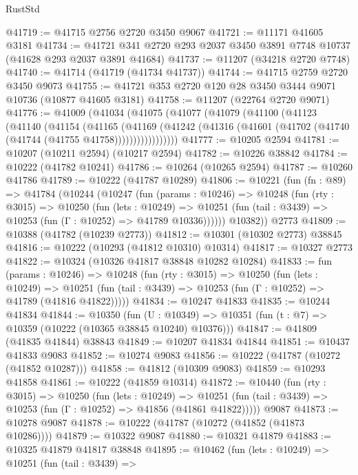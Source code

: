 \begin{lexlean}{RustStd}
\begin{coremodule}
@41719 := @41715 @2756 @2720 @3450 @9067
@41721 := @11171 @41605 @3181
@41734 := @41721 @341 @2720 @293 @2037 @3450 @3891 @7748 @10737 (@41628 @293 @2037 @3891 @41684)
@41737 := @11207 (@34218 @2720 @7748)
@41740 := @41714 (@41719 (@41734 @41737))
@41744 := @41715 @2759 @2720 @3450 @9073
@41755 := @41721 @353 @2720 @120 @28 @3450 @3444 @9071 @10736 (@10877 @41605 @3181)
@41758 := @11207 (@22764 @2720 @9071)
@41776 := @41009
    (@41034
      (@41075
        (@41077
          (@41079
            (@41100
              (@41123
                (@41140
                  (@41154
                    (@41165
                      (@41169
                        (@41242
                          (@41316 (@41601 (@41702 (@41740 (@41744 (@41755 @41758)))))))))))))))))
@41777 := @10205 @2594
@41781 := @10207 (@10211 @2594) (@10217 @2594)
@41782 := @10226 @38842
@41784 := @10222 (@41782 @10241)
@41786 := @10264 (@10265 @2594)
@41787 := @10260 @41786
@41789 := @10222 (@41787 @10289)
@41806 := @10221
    (fun (fn : @89) =>
    @41784
      (@10244
        (@10247
          (fun (params : @10246) =>
          @10248
            (fun (rty : @3015) =>
            @10250
              (fun (lets : @10249) =>
              @10251 (fun (tail : @3439) => @10253 (fun (Γ : @10252) => @41789 @10336))))))
        @10382))
    @2773
@41809 := @10388 (@41782 (@10239 @2773))
@41812 := @10301 (@10302 @2773) @38845
@41816 := @10222 (@10293 (@41812 @10310) @10314)
@41817 := @10327 @2773
@41822 := @10324 (@10326 @41817 @38848 @10282 @10284)
@41833 := fun (params : @10246) =>
  @10248
    (fun (rty : @3015) =>
    @10250
      (fun (lets : @10249) =>
      @10251 (fun (tail : @3439) => @10253 (fun (Γ : @10252) => @41789 (@41816 @41822)))))
@41834 := @10247 @41833
@41835 := @10244 @41834
@41844 := @10350
    (fun (U : @10349) => @10351 (fun (t : @7) => @10359 (@10222 (@10365 @38845 @10240) @10376)))
@41847 := @41809 (@41835 @41844) @38843
@41849 := @10207 @41834 @41844
@41851 := @10437 @41833 @9083
@41852 := @10274 @9083
@41856 := @10222 (@41787 (@10272 (@41852 @10287)))
@41858 := @41812 (@10309 @9083)
@41859 := @10293 @41858
@41861 := @10222 (@41859 @10314)
@41872 := @10440
    (fun (rty : @3015) =>
    @10250
      (fun (lets : @10249) =>
      @10251 (fun (tail : @3439) => @10253 (fun (Γ : @10252) => @41856 (@41861 @41822)))))
    @9087
@41873 := @10278 @9087
@41878 := @10222 (@41787 (@10272 (@41852 (@41873 @10286))))
@41879 := @10322 @9087
@41880 := @10321 @41879
@41883 := @10325 @41879 @41817 @38848
@41895 := @10462
    (fun (lets : @10249) =>
    @10251
      (fun (tail : @3439) =>

\end{coremodule}
\end{lexlean}
